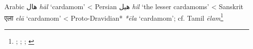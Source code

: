 \begin{etymology}\label{ety:hal}
Arabic {هال} \textit{hāl} `cardamom'
< Persian {هیل} \textit{hil} `the lesser cardamoms'
< Sanskrit {एला} \textit{elā} `cardamom'
< Proto-Dravidian* \textit{*ēla} `cardamom'; cf. Tamil \textit{ēlam}\footnote{\textcite[1223]{wehr_dictionary_1976}; \textcite[1521]{steingass_comprehensive_1892}; \textcite[104]{dalby_dangerous_2000}; \textcite[87]{burrow_dravidian_1984}}
\end{etymology}